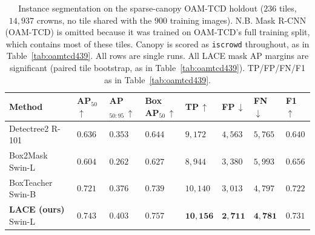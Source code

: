 \documentclass[remotesensing,article,submit,moreauthors]{Definitions/mdpi}
\begin{document}
\begin{table}[H]
\caption{Instance segmentation on the sparse-canopy OAM-TCD holdout ($236$ tiles, $14{,}937$ crowns, no tile shared with the $900$ training images). N.B. Mask R-CNN (OAM-TCD) is omitted because it was trained on OAM-TCD's full training split, which contains most of these tiles. Canopy is scored as \texttt{iscrowd} throughout, as in Table~\ref{tab:oamtcd439}. All rows are single runs. All LACE mask AP margins are significant (paired tile bootstrap, as in Table~\ref{tab:oamtcd439}). TP/FP/FN/F1 as in Table~\ref{tab:oamtcd439}.\label{tab:sparse236}} 
\setlength{\tabcolsep}{3pt}
\begin{tabularx}{\textwidth}{lCCCCCCC}
\toprule
\textbf{Method} & \textbf{AP\boldmath$_{50}$}\,$\uparrow$ &
\textbf{AP\boldmath$_{50:95}$}\,$\uparrow$ &
\textbf{Box AP\boldmath$_{50}$}\,$\uparrow$ &
\textbf{TP}\,$\uparrow$ & \textbf{FP}\,$\downarrow$ & \textbf{FN}\,$\downarrow$ & \textbf{F1}\,$\uparrow$ \\
\midrule
Detectree2 R-101 & $0.636$ & $0.353$ & $0.644$ & $9{,}172$ & $4{,}563$ & $5{,}765$ & $0.640$ \\
Box2Mask Swin-L & $0.604$ & $0.262$ & $0.627$ & $8{,}944$ & $3{,}380$ & $5{,}993$ & $0.656$ \\
BoxTeacher Swin-B & $0.721$ & $0.376$ & $0.739$ & $10{,}140$ & $3{,}013$ & $4{,}797$ & $0.722$ \\
\textbf{LACE (ours)} Swin-L & $\mathbf{0.743}$ & $\mathbf{0.403}$
  & $\mathbf{0.757}$ & $\mathbf{10{,}156}$ & $\mathbf{2{,}711}$ & $\mathbf{4{,}781}$ & $\mathbf{0.731}$ \\
\bottomrule
\end{tabularx}
\end{table}
\end{document}
